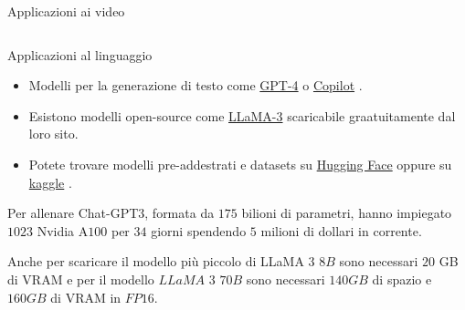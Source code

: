 \documentclass[aspectratio=169]{beamer}
\begin{document}
\begin{frame}{Applicazioni ai video}
\begin{columns}[T]
\begin{column}{.33\textwidth}
\begin{center}
            \end{center}
        \end{column}
    \end{columns}
\end{frame}

\begin{frame}{Applicazioni al linguaggio}
    \begin{itemize}
    \item Modelli per la generazione di testo come \href{https://openai.com/index/gpt-4/}{GPT-4}  o \href{https://github.com/features/copilot}{Copilot} .
    \item Esistono modelli open-source come \href{https://llama.meta.com/}{LLaMA-3}  scaricabile graatuitamente dal loro sito. 
    \item Potete trovare modelli pre-addestrati e datasets su \href{https://huggingface.co/}{Hugging Face}  oppure su \href{https://www.kaggle.com/}{kaggle} .
\end{itemize}
    \pause
    \vspace{0.3cm}
    Per allenare Chat-GPT3, formata da $175$ bilioni di parametri, hanno impiegato $1023$ Nvidia A$100$ per $34$ giorni spendendo $5$ milioni di dollari in corrente.
    
    \vspace{0.3cm}
    \pause
    Anche per scaricare il modello più piccolo di LLaMA $3$ $8B$ sono necessari $20$ GB di VRAM e per il modello $LLaMA$ $3$ $70B$ sono necessari $140GB$ di spazio e $160GB$ di VRAM in $FP16$.
\end{frame}
\end{document}
